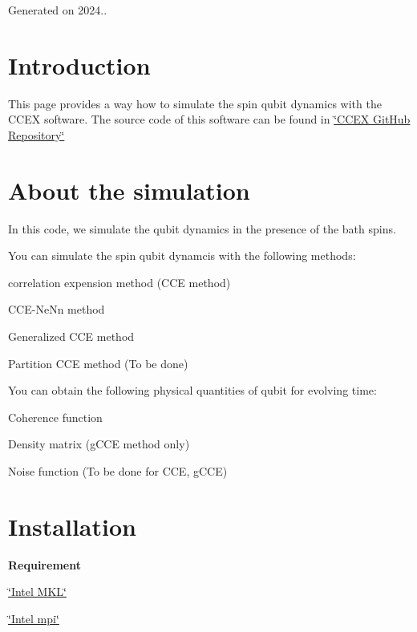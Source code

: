 Generated on 2024..\hypertarget{Overview_Introduction}{}\section{Introduction}\label{Overview_Introduction}
This page provides a way how to simulate the spin qubit dynamics with the C\-C\-E\-X software. The source code of this software can be found in \hyperlink{}{\char`\"{}\-C\-C\-E\-X Git\-Hub Repository\char`\"{} }\hypertarget{Overview_AboutTheSimulation}{}\section{About the simulation}\label{Overview_AboutTheSimulation}
In this code, we simulate the qubit dynamics in the presence of the bath spins.

You can simulate the spin qubit dynamcis with the following methods\-:
\begin{DoxyItemize}
\item correlation expension method (C\-C\-E method)
\item C\-C\-E-\/\-Ne\-Nn method
\item Generalized C\-C\-E method
\item Partition C\-C\-E method (To be done)
\end{DoxyItemize}

You can obtain the following physical quantities of qubit for evolving time\-:
\begin{DoxyItemize}
\item Coherence function
\item Density matrix (g\-C\-C\-E method only)
\item Noise function (To be done for C\-C\-E, g\-C\-C\-E)
\end{DoxyItemize}\hypertarget{Overview_Installation}{}\section{Installation}\label{Overview_Installation}



{\bfseries Requirement} {\bfseries } 
\begin{DoxyItemize}
\item \hyperlink{}{\char`\"{}\-Intel M\-K\-L\char`\"{} }
\item \hyperlink{}{\char`\"{}\-Intel mpi\char`\"{} }
\end{DoxyItemize}

